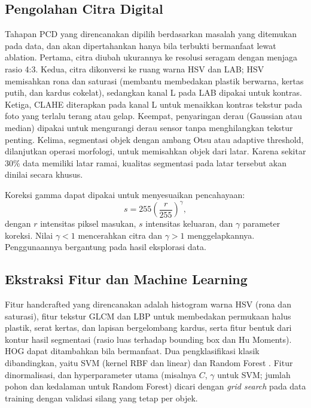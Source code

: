 \documentclass[10pt,twocolumn,a4paper]{article}
\begin{document}
\subsection{Pengolahan Citra Digital}
Tahapan PCD yang direncanakan dipilih berdasarkan masalah yang ditemukan pada data, dan akan dipertahankan hanya bila terbukti bermanfaat lewat ablation. Pertama, citra diubah ukurannya ke resolusi seragam dengan menjaga rasio 4:3. Kedua, citra dikonversi ke ruang warna HSV dan LAB; HSV memisahkan rona dan saturasi (membantu membedakan plastik berwarna, kertas putih, dan kardus cokelat), sedangkan kanal L pada LAB dipakai untuk kontras. Ketiga, CLAHE \cite{pizer1987} diterapkan pada kanal L untuk menaikkan kontras tekstur pada foto yang terlalu terang atau gelap. Keempat, penyaringan derau (Gaussian atau median) dipakai untuk mengurangi derau sensor tanpa menghilangkan tekstur penting. Kelima, segmentasi objek dengan ambang Otsu \cite{otsu1979} atau adaptive threshold, dilanjutkan operasi morfologi, untuk memisahkan objek dari latar. Karena sekitar 30\% data memiliki latar ramai, kualitas segmentasi pada latar tersebut akan dinilai secara khusus.

Koreksi gamma dapat dipakai untuk menyesuaikan pencahayaan:
\begin{equation}
 s = 255\left(\frac{r}{255}\right)^{\gamma},
 \label{eq:gamma}
\end{equation}
dengan $r$ intensitas piksel masukan, $s$ intensitas keluaran, dan $\gamma$ parameter koreksi. Nilai $\gamma<1$ mencerahkan citra dan $\gamma>1$ menggelapkannya. Penggunaannya bergantung pada hasil eksplorasi data.

\subsection{Ekstraksi Fitur dan Machine Learning}
Fitur handcrafted yang direncanakan adalah histogram warna HSV (rona dan saturasi), fitur tekstur GLCM \cite{haralick1973} dan LBP \cite{ojala2002} untuk membedakan permukaan halus plastik, serat kertas, dan lapisan bergelombang kardus, serta fitur bentuk dari kontur hasil segmentasi (rasio luas terhadap bounding box dan Hu Moments). HOG \cite{dalal2005} dapat ditambahkan bila bermanfaat. Dua pengklasifikasi klasik dibandingkan, yaitu SVM \cite{cortes1995} (kernel RBF dan linear) dan Random Forest \cite{breiman2001}. Fitur dinormalisasi, dan hyperparameter utama (misalnya $C$, $\gamma$ untuk SVM; jumlah pohon dan kedalaman untuk Random Forest) dicari dengan \textit{grid search} pada data training dengan validasi silang yang tetap per objek.
\end{document}

